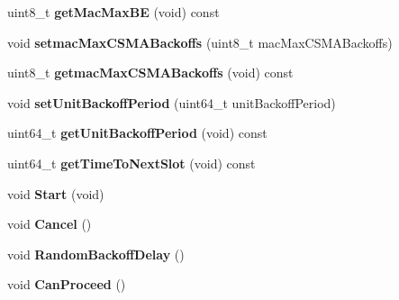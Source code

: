 \begin{DoxyCompactItemize}
\item 
\hypertarget{classns3_1_1PLC__CsmaCa_a0d0ecb143f6328464e1de1a7bc6b539e}{uint8\-\_\-t {\bfseries get\-Mac\-Max\-B\-E} (void) const }\label{classns3_1_1PLC__CsmaCa_a0d0ecb143f6328464e1de1a7bc6b539e}

\item 
\hypertarget{classns3_1_1PLC__CsmaCa_a2f7059808f5f75be044367bf345fa6a7}{void {\bfseries setmac\-Max\-C\-S\-M\-A\-Backoffs} (uint8\-\_\-t mac\-Max\-C\-S\-M\-A\-Backoffs)}\label{classns3_1_1PLC__CsmaCa_a2f7059808f5f75be044367bf345fa6a7}

\item 
\hypertarget{classns3_1_1PLC__CsmaCa_ae56726929f60c5c81a123f6b82a0ec30}{uint8\-\_\-t {\bfseries getmac\-Max\-C\-S\-M\-A\-Backoffs} (void) const }\label{classns3_1_1PLC__CsmaCa_ae56726929f60c5c81a123f6b82a0ec30}

\item 
\hypertarget{classns3_1_1PLC__CsmaCa_a36882837b0c7f2a6ffb2fbe36b2e54f1}{void {\bfseries set\-Unit\-Backoff\-Period} (uint64\-\_\-t unit\-Backoff\-Period)}\label{classns3_1_1PLC__CsmaCa_a36882837b0c7f2a6ffb2fbe36b2e54f1}

\item 
\hypertarget{classns3_1_1PLC__CsmaCa_a11e4060ce3cc673eb538e57bd2ca03c2}{uint64\-\_\-t {\bfseries get\-Unit\-Backoff\-Period} (void) const }\label{classns3_1_1PLC__CsmaCa_a11e4060ce3cc673eb538e57bd2ca03c2}

\item 
\hypertarget{classns3_1_1PLC__CsmaCa_af7c76f10c1638a3a4ade03a1034cb05d}{uint64\-\_\-t {\bfseries get\-Time\-To\-Next\-Slot} (void) const }\label{classns3_1_1PLC__CsmaCa_af7c76f10c1638a3a4ade03a1034cb05d}

\item 
\hypertarget{classns3_1_1PLC__CsmaCa_ad5637ae180a675c63e7325ff35748d1f}{void {\bfseries \-Start} (void)}\label{classns3_1_1PLC__CsmaCa_ad5637ae180a675c63e7325ff35748d1f}

\item 
\hypertarget{classns3_1_1PLC__CsmaCa_acda66d73f1948d040843bda1f8e3d01f}{void {\bfseries \-Cancel} ()}\label{classns3_1_1PLC__CsmaCa_acda66d73f1948d040843bda1f8e3d01f}

\item 
\hypertarget{classns3_1_1PLC__CsmaCa_a73bec7115539950445814005a725ee67}{void {\bfseries \-Random\-Backoff\-Delay} ()}\label{classns3_1_1PLC__CsmaCa_a73bec7115539950445814005a725ee67}

\item 
\hypertarget{classns3_1_1PLC__CsmaCa_a71222a09dd34258d738fd9a907c5a4b0}{void {\bfseries \-Can\-Proceed} ()}\label{classns3_1_1PLC__CsmaCa_a71222a09dd34258d738fd9a907c5a4b0}


\end{DoxyCompactItemize}
